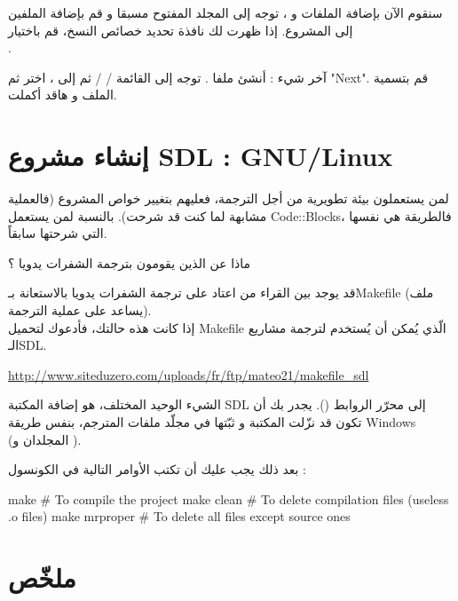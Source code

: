 سنقوم الآن بإضافة الملفات
و 
،
توجه إلى المجلد 
المفتوح مسبقا و قم بإضافة الملفين إلى المشروع. إذا ظهرت لك نافذة تحديد خصائص النسخ، قم باختيار\\
.

آخر شيء : أنشئ ملفا
.
توجه إلى القائمة 
 /  / 
ثم إلى 
، 
اختر
ثم
"\textenglish{Next}".
قم بتسمية الملف و هاقد أكملت.

\section{إنشاء مشروع \textenglish{SDL} :  \textenglish{GNU/Linux}}

لمن يستعملون بيئة تطويرية من أجل الترجمة، فعليهم بتغيير خواص المشروع (فالعملية مشابهة لما كنت قد شرحت). بالنسبة لمن يستعمل
\textenglish{Code::Blocks}،
فالطريقة هي نفسها التي شرحتها سابقاً.

\begin{question}
 ماذا عن الذين يقومون بترجمة الشفرات يدويا ؟
\end{question}

قد يوجد بين القراء من اعتاد على ترجمة الشفرات يدويا بالاستعانة بـ\textenglish{Makefile}
(ملف يساعد على عملية الترجمة).\\
إذا كانت هذه حالتك، فأدعوك لتحميل
\textenglish{Makefile}
الّذي يُمكن أن يُستخدم لترجمة مشاريع الـ\textenglish{SDL}.

\url{http://www.siteduzero.com/uploads/fr/ftp/mateo21/makefile_sdl}

الشيء الوحيد المختلف، هو إضافة المكتبة
\textenglish{SDL}
إلى محرّر الروابط
().
يجدر بك أن تكون قد نزّلت المكتبة و ثبّتها في مجلّد ملفات المترجم، بنفس طريقة
\textenglish{Windows}
(المجلدان
و 
).

بعد ذلك يجب عليك أن تكتب الأوامر التالية في الكونسول :

\begin{Console}
make      	# To compile the project
make clean	# To delete compilation files (useless .o files)
make mrproper	# To delete all files except source ones
\end{Console}

\section*{ملخّص}

